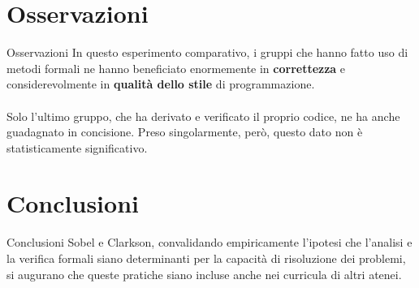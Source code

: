 \documentclass{beamer}
\begin{document}
\section{Osservazioni}

\begin{frame}{Osservazioni}
	In questo esperimento comparativo, i gruppi che hanno fatto uso di metodi
	formali ne hanno beneficiato enormemente in \textbf{correttezza} e
	considerevolmente in \textbf{qualità dello stile} di programmazione.
	\\~\\
	Solo l'ultimo gruppo, che ha derivato e verificato il proprio codice, ne ha
	anche guadagnato in concisione. Preso singolarmente, però, questo dato non è
	statisticamente significativo.
\end{frame}

\section{Conclusioni}
\begin{frame}{Conclusioni}
	Sobel e Clarkson, convalidando empiricamente l'ipotesi che l'analisi e la
	verifica formali siano determinanti per la capacità di risoluzione dei
	problemi, si augurano che queste pratiche siano incluse anche nei curricula di
	altri atenei.
\end{frame}
\end{document}
